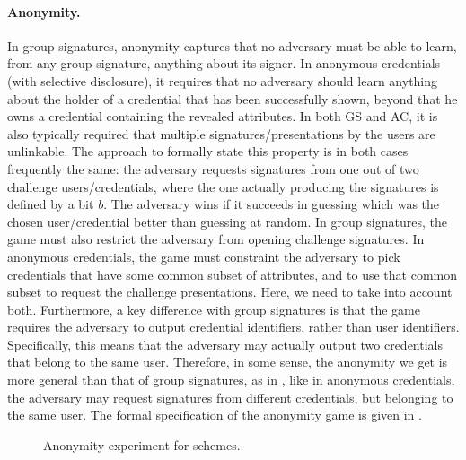 \paragraph{Anonymity.} %
In group signatures, anonymity captures that no adversary must be able to learn,
from any group signature, anything about its signer. In anonymous credentials
(with selective disclosure), it requires that no adversary should learn anything
about the holder of a credential that has been successfully shown, beyond that
he owns a credential containing the revealed attributes. In both GS and AC, it
is also typically required that
multiple signatures/presentations by the users are unlinkable. The approach to
formally state this property is in both cases frequently the same: the adversary
requests signatures from one out of two challenge users/credentials, where the
one actually producing the signatures is defined by a bit $b$. The adversary
wins if it succeeds in guessing which was the chosen user/credential better than
guessing at random. In group signatures, the game must also restrict the
adversary from opening challenge
signatures. In anonymous credentials, the game must constraint the
adversary to pick credentials that have some common subset of attributes, and
to use that common subset to request the challenge presentations. Here, we need
to take into account both. Furthermore, a key difference with group signatures
is that the game requires the adversary to output credential identifiers, rather
than user identifiers. Specifically, this means that the adversary may actually
output two credentials that belong to the same user. Therefore, in some sense,
the anonymity we get is more general than that of group signatures, as in \GSAC,
like in anonymous credentials, the adversary may request signatures from
different credentials, but belonging to the same user. The formal
specification of the anonymity game is given in .

\begin{figure}[htp!]
  \caption{Anonymity experiment for \GSAC schemes.}
  \label{fig:exp-gsac-anonb}
\end{figure}

